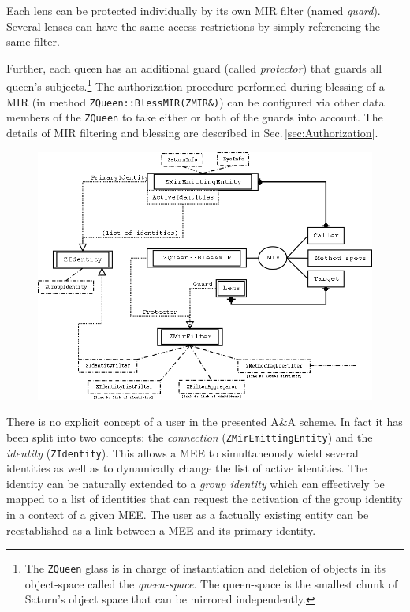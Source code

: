 \documentclass[a4paper,11pt]{article}
\def\smalltt#1{{\small\texttt{#1}}}
\def\foottt#1{{\footnotesize\texttt{#1}}}
\begin{document}
Each lens can be protected individually by its own MIR filter (named
\emph{guard}). Several lenses can have the same access restrictions by
simply referencing the same filter.

Further, each queen has an additional guard (called \emph{protector})
that guards all queen's subjects.\footnote{The \foottt{ZQueen} glass is in
  charge of instantiation and deletion of objects in its object-space
  called the \emph{queen-space}. The queen-space is the smallest chunk
  of Saturn's object space that can be mirrored independently.} %
The authorization procedure performed during
blessing of a MIR (in method \smalltt{ZQueen::\-BlessMIR(ZMIR\&)}) can be
configured via other data members of the \smalltt{ZQueen} to take
either or both of the guards into account. The details of MIR
filtering and blessing are described in Sec.\,\ref{sec:Authorization}.

\begin{figure}[tb]
\centering
\includegraphics[width=\textwidth]{aa_elements}
\caption{}
\label{fig:AA_elements}
\end{figure}


There is no explicit concept of a user in the presented A\&A scheme.
In fact it has been split into two concepts: the \emph{connection}
(\smalltt{ZMirEmittingEntity}) and the \emph{identity}
(\smalltt{ZIdentity}). This allows a MEE to simultaneously wield
several identities as well as to dynamically change the list of active
identities. The identity can be naturally extended to a \emph{group
  identity} which can effectively be mapped to a list of identities
that can request the activation of the group identity in a context
of a given MEE. The user as a factually existing entity can be
reestablished as a link between a MEE and its primary identity.
\end{document}

